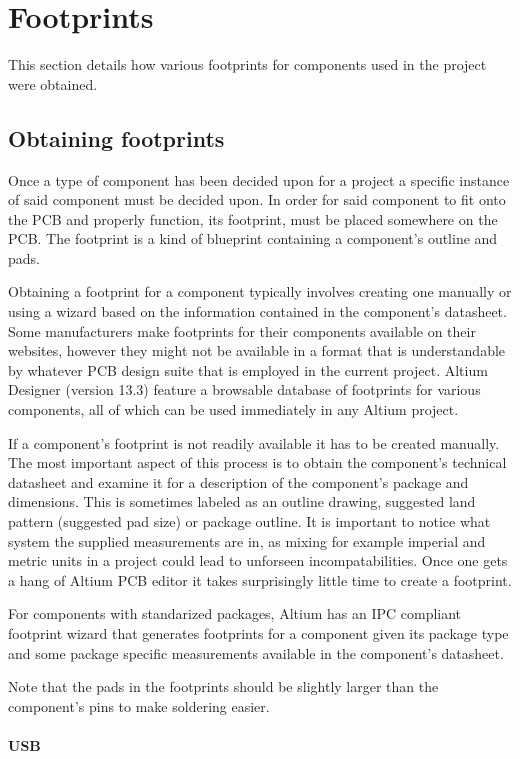 \section{Footprints}
This section details how various footprints for components used in the project were obtained.

\subsection{Obtaining footprints}
Once a type of component has been decided upon for a project a specific instance of said component must be decided upon.
In order for said component to fit onto the PCB and properly function, its footprint, must be placed somewhere on the PCB.
The footprint is a kind of blueprint containing a component's outline and pads.

Obtaining a footprint for a component typically involves creating one manually or using a wizard based on the information contained in the component's datasheet.
Some manufacturers make footprints for their components available on their websites, however they might not be available in a format that is understandable by whatever PCB design suite that is employed in the current project.
Altium Designer (version 13.3) feature a browsable database of footprints for various components, all of which can be used immediately in any Altium project.

If a component's footprint is not readily available it has to be created manually.
The most important aspect of this process is to obtain the component's technical datasheet and examine it for a description of the component's package and dimensions.
This is sometimes labeled as an outline drawing, suggested land pattern (suggested pad size) or package outline.
It is important to notice what system the supplied measurements are in, as mixing for example imperial and metric units in a project could lead to unforseen incompatabilities.
Once one gets a hang of Altium PCB editor it takes surprisingly little time to create a footprint.

For components with standarized packages, Altium has an IPC compliant footprint wizard that generates footprints for a component given its package type and some package specific measurements available in the component's datasheet.

Note that the pads in the footprints should be slightly larger than the component's pins to make soldering easier.

\paragraph{USB}

